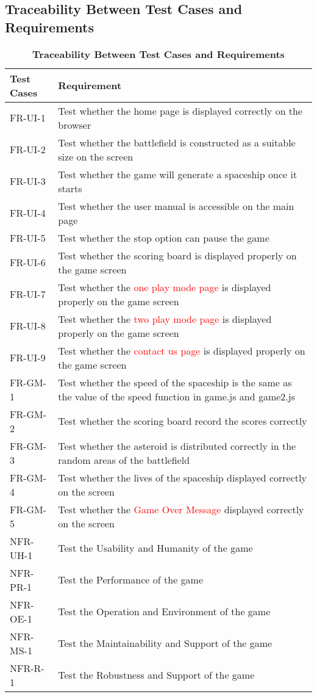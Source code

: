 \documentclass[12pt, titlepage]{article}
\begin{document}
\subsection{Traceability Between Test Cases and Requirements}
\begin{table}[hbp]
\caption{\textbf{Traceability Between Test Cases and Requirements}} \label{Table}

\begin{tabularx}{\textwidth}{p{3cm}X}
\toprule
\textbf{Test Cases} & \textbf{Requirement} \\
\midrule
FR-UI-1 & Test whether the home page is displayed correctly on the browser\\
FR-UI-2 & Test whether the battlefield is constructed as a suitable size on the screen\\
FR-UI-3 & Test whether the game will generate a spaceship once it starts\\
FR-UI-4 & Test whether the user manual is accessible on the main page\\
FR-UI-5 & Test whether the stop option can pause the game\\
FR-UI-6 & Test whether the scoring board is displayed properly on the game screen\\
FR-UI-7 & Test whether the \textcolor{red}{one play mode page} is displayed properly on the game screen\\
FR-UI-8 & Test whether the \textcolor{red}{two play mode page} is displayed properly on the game screen\\
FR-UI-9 & Test whether the \textcolor{red}{contact us page} is displayed properly on the game screen\\


FR-GM-1 & Test whether the speed of the spaceship is the same as the value of the speed function in game.js and game2.js\\
FR-GM-2 & Test whether the scoring board record the scores correctly\\
FR-GM-3 & Test whether the asteroid is distributed correctly in the random areas of the battlefield\\
FR-GM-4 & Test whether the lives of the spaceship displayed correctly on the screen\\
FR-GM-5 & Test whether the \textcolor{red}{Game Over Message} displayed correctly on the screen\\
NFR-UH-1 & Test the Usability and Humanity of the game\\
NFR-PR-1 & Test the Performance of the game\\
NFR-OE-1 & Test the Operation and Environment of the game\\
NFR-MS-1 & Test the Maintainability and Support of the game\\
NFR-R-1 & Test the Robustness and Support of the game\\
\bottomrule
\end{tabularx}
\end{table}
\end{document}
